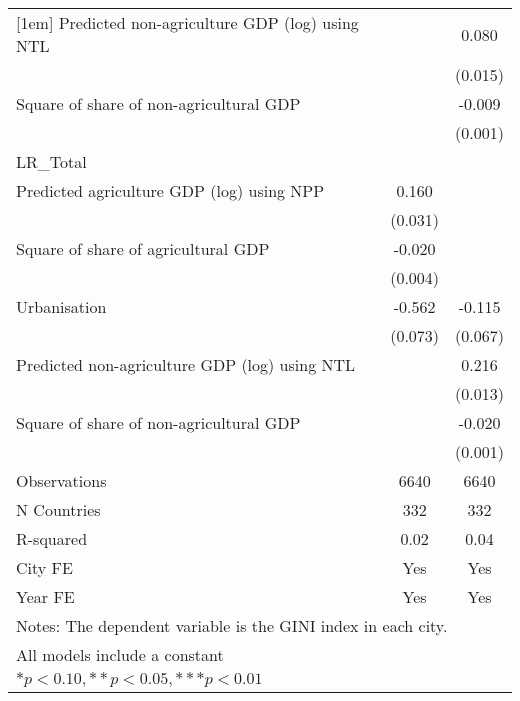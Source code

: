 {\begin{tabular}{l*{2}{c}}
[1em]
Predicted non-agriculture GDP (log) using NTL&                     &       0.080\sym{***}\\
                    &                     &     (0.015)         \\
[1em]
Square of share of non-agricultural GDP&                     &      -0.009\sym{***}\\
                    &                     &     (0.001)         \\
\hline
LR\_Total            &                     &                     \\
Predicted agriculture GDP (log) using NPP&       0.160\sym{***}&                     \\
                    &     (0.031)         &                     \\
[1em]
Square of share of agricultural GDP&      -0.020\sym{***}&                     \\
                    &     (0.004)         &                     \\
[1em]
Urbanisation        &      -0.562\sym{***}&      -0.115\sym{*}  \\
                    &     (0.073)         &     (0.067)         \\
[1em]
Predicted non-agriculture GDP (log) using NTL&                     &       0.216\sym{***}\\
                    &                     &     (0.013)         \\
[1em]
Square of share of non-agricultural GDP&                     &      -0.020\sym{***}\\
                    &                     &     (0.001)         \\
\hline
Observations        &        6640         &        6640         \\
N Countries         &         332         &         332         \\
R-squared           &        0.02         &        0.04         \\
City FE             &         Yes         &         Yes         \\
Year FE             &         Yes         &         Yes         \\
\hline\hline
\multicolumn{3}{l}{\footnotesize Notes: The dependent variable is the GINI index in each city.}\\
\multicolumn{3}{l}{\footnotesize All models include a constant}\\
\multicolumn{3}{l}{\footnotesize $* p<0.10, ** p<0.05, *** p<0.01$}\\
\end{tabular}
}
